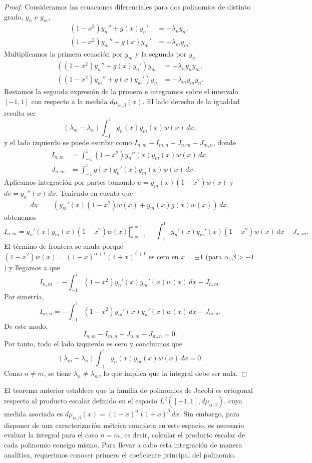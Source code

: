 \documentclass[12pt,a4paper]{book}
\begin{document}
\begin{proof}
Consideramos las ecuaciones diferenciales para dos polinomios de distinto grado, $y_n$ e $y_m$,
\begin{align*}
    (1-x^2)y_n'' + g(x)y_n' &= -\lambda_n y_n, \\
    (1-x^2)y_m'' + g(x)y_m' &= -\lambda_m y_m.
\end{align*}
Multiplicamos la primera ecuación por $y_m$ y la segunda por $y_n$
\begin{align*}
    ((1-x^2)y_n'' + g(x)y_n') y_m &= -\lambda_n y_n y_m, \\
    ((1-x^2)y_m'' + g(x)y_m') y_n &= -\lambda_m y_m y_n.
\end{align*}
Restamos la segunda expresión de la primera e integramos sobre el intervalo $[-1, 1]$ con respecto a la medida $d\mu_{\alpha, \beta}(x)$. El lado derecho de la igualdad resulta ser
\[
(\lambda_m - \lambda_n) \int_{-1}^{1} y_n(x) y_m(x) w(x) \, dx,
\]
y el lado izquierdo se puede escribir como $I_{n,m} - I_{m,n} + J_{n,m} - J_{m,n}$, donde
\begin{align*}
    I_{n,m} &= \int_{-1}^{1} (1-x^2)y_n''(x) y_m(x) w(x) \, dx, \\
    J_{n,m} &= \int_{-1}^{1} g(x)y_n'(x) y_m(x) w(x) \, dx.
\end{align*}       
Aplicamos integración por partes tomando $u = y_m(x) (1-x^2)w(x)$ y $dv = y_n''(x) \, dx$. Teniendo en cuenta que
\begin{align*}
    du &= ( y_m'(x) (1-x^2)w(x) + y_m(x) g(x)w(x) ) \, dx,
\end{align*}
obtenemos
\[
I_{n,m} = \left. y_n'(x) y_m(x) (1-x^2)w(x) \right|_{x=-1}^{x=1} - \int_{-1}^{1} y_n'(x) y_m'(x) (1-x^2)w(x)\, dx - J_{n,m}.
\]
El término de frontera se anula porque $(1-x^2)w(x) = (1-x)^{\alpha+1}(1+x)^{\beta+1}$ es cero en $x=\pm 1$ (para $\alpha, \beta > -1$) y llegamos a que 
\[
I_{n,m} = - \int_{-1}^{1} (1-x^2) y_n'(x) y_m'(x)w(x) \, dx - J_{n,m}.
\]
Por simetría, 
\[
I_{m,n} = - \int_{-1}^{1} (1-x^2) y_m'(x) y_n'(x)w(x) \, dx - J_{m,n}.
\]
De este modo,
\[
I_{n,m} - I_{m,n} + J_{n,m}-J_{m,n} = 0.
\] 
Por tanto, todo el lado izquierdo es cero y concluimos que
\[
(\lambda_m - \lambda_n) \int_{-1}^{1} y_n(x) y_m(x)w(x) \, dx = 0.
\]
Como $n \neq m$, se tiene $\lambda_n \neq \lambda_m$, lo que implica que la integral debe ser nula.
\end{proof}

El teorema anterior establece que la familia de polinomios de Jacobi es ortogonal respecto al producto escalar definido en el espacio $L^2([-1,1], d\mu_{\alpha, \beta})$, cuya medida asociada es $d\mu_{\alpha, \beta}(x) = (1-x)^\alpha (1+x)^\beta \, dx$. Sin embargo, para disponer de una caracterización métrica completa en este espacio, es necesario evaluar la integral para el caso $n=m$, es decir, calcular el producto escalar de cada polinomio consigo mismo. Para llevar a cabo esta integración de manera analítica, requerimos conocer primero el coeficiente principal del polinomio.
\end{document}
